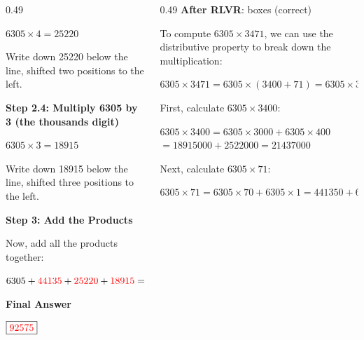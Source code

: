 \begin{frame}
\begin{columns}[T]
\begin{column}{0.49\linewidth}
\begin{block}{}
    {\centering $6305 \times 4 = 25220$\par}
    Write down 25220 below the line, shifted two positions to the left.\par
    \par
    \textbf{Step 2.4: Multiply 6305 by 3 (the thousands digit)}\par
    {\centering $6305 \times 3 = 18915$\par}
    Write down 18915 below the line, shifted three positions to the left.\par
    \par
    \textbf{Step 3: Add the Products}\par
    Now, add all the products together:\par
    {\centering $6305 + \textcolor{red}{44135} + \textcolor{red}{25220} + \textcolor{red}{18915} = \textcolor{red}{92575}$\par}
    \par
    \textbf{Final Answer}\par
    {\centering $\boxed{\textcolor{red}{92575}}$\par}
    \end{block}
    \end{column}
    \begin{column}{0.49\linewidth}
    \centering \footnotesize \textbf{After RLVR}: boxes  (correct)
    \begin{block}{}
    \raggedright \tiny \setlength{\parskip}{0pt}\setlength{\abovedisplayskip}{1pt}\setlength{\belowdisplayskip}{1pt}\setlength{\abovedisplayshortskip}{0pt}\setlength{\belowdisplayshortskip}{1pt}
    To compute $6305 \times 3471$, we can use the distributive property to break down the multiplication:\par
    \par
    {\centering $6305 \times 3471 = 6305 \times (3400 + 71) = 6305 \times 3400 + 6305 \times 71$\par}
    \par
    First, calculate $6305 \times 3400$:\par
    \par
    {\centering $6305 \times 3400 = 6305 \times 3000 + 6305 \times 400$\\$= 18915000 + 2522000 = 21437000$\par}
    \par
    Next, calculate $6305 \times 71$:\par
    \par
    {\centering $6305 \times 71 = 6305 \times 70 + 6305 \times 1 = 441350 + 6305 = 447655$\par}

\end{block}
\end{column}
\end{columns}
\end{frame}
